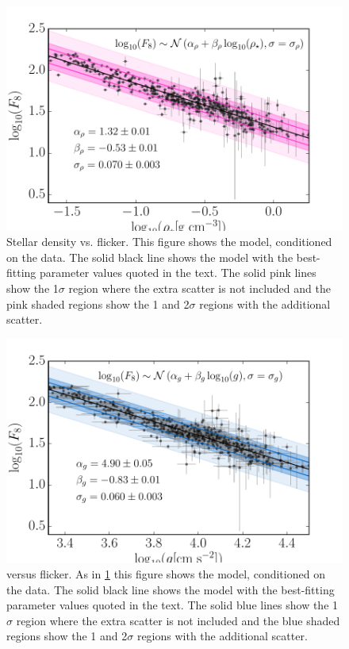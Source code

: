 \begin{figure}
\begin{center}
\includegraphics[width=6in,angle=0,clip=true]{figures/flicker_vs_rho.pdf}
\caption[Stellar density versus flicker.]{
Stellar density vs. flicker.
This figure shows the model, conditioned on the data.
The solid black line shows the model with the best-fitting parameter values
quoted in the text.
The solid pink lines show the 1$\sigma$ region where the extra scatter is not
included and the pink shaded regions show the 1 and 2$\sigma$ regions with the
additional scatter.}
\label{fig:rhostar}
\end{center}
\end{figure}

\begin{figure}
\begin{center}
\includegraphics[width=6in,angle=0,clip=true]{figures/flicker_vs_logg.pdf}
\caption[\logg versus flicker.]{
\logg versus flicker.
As in \ref{fig:rhostar} this figure shows the model, conditioned on the data.
The solid black line shows the model with the best-fitting parameter values
quoted in the text.
The solid blue lines show the 1$\sigma$ region where the extra scatter is not
included and the blue shaded regions show the 1 and 2$\sigma$ regions with the
additional scatter.}
\label{fig:logg}
\end{center}
\end{figure}

